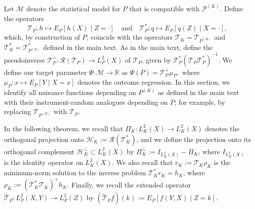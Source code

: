 \documentclass[11pt]{article}
\theoremstyle{plain}
\theoremstyle{definition}
\theoremstyle{remark}
\theoremstyle{definition}
\begin{document}
Let \( \mathcal{M} \) denote the statistical model for \( P \) that is compatible with $\mathcal{P}^{(K)}$. Define the operators
\[
\mathcal{T}_P: h \mapsto E_P[h(X) \mid Z = \cdot] \quad \text{and} \quad \mathcal{T}_P^*: q \mapsto E_P[q(Z) \mid X = \cdot],
\]
which, by construction of \( P \), coincide with the operators \( \mathcal{T}_K = \mathcal{T}_{P^{(K)}} \) and \( \mathcal{T}_K^* = \mathcal{T}_{P^{(K)}}^* \) defined in the main text. As in the main text, define the pseudoinverse \( \mathcal{T}_P^+: \mathcal{R}(\mathcal{T}_P) \to L^2_P(X) \) of \( \mathcal{T}_P \), given by \( \mathcal{T}_P^* (\mathcal{T}_P \mathcal{T}_P^*)^{-1} \). We define our target parameter \( \Psi: \mathcal{M} \rightarrow \mathbb{R} \) as $\Psi(P) = \mathcal{T}_P^+ \mu_P,$
where \( \mu_P: x \mapsto E_P[Y \mid X = x] \) denotes the outcome regression. In this section, we identify all nuisance functions depending on \( P^{(K)} \) as defined in the main text with their instrument-random analogues depending on \( P \); for example, by replacing \( \mathcal{T}_{P^{(K)}} \) with \( \mathcal{T}_P \).


 

In the following theorem, we recall that \( \Pi_K : L_K^2(X) \to L_K^2(X) \) denotes the orthogonal projection onto \( \mathcal{H}_K := \mathcal{R}(\mathcal{T}_K^*) \), and we define the projection onto its orthogonal complement \( \mathcal{H}_K^\perp \subset L_K^2(X) \) by \( \Pi_K^\perp := I_{L_K^2(X)} - \Pi_K \), where \( I_{L_K^2(X)} \) is the identity operator on \( L_K^2(X) \). We also recall that \( r_K := \mathcal{T}_K \rho_K \) is the minimum-norm solution to the inverse problem \( \mathcal{T}_K^* r_K = h_K \), where \( \rho_K := (\mathcal{T}_K^* \mathcal{T}_K)^+ h_K \). Finally, we recall the extended operator $\widetilde{\mathcal{T}}_P: L^2_P(X,Y) \rightarrow L^2_P(Z)$ by $(\widetilde{\mathcal{T}}_Pf)(k) := E_{P}[f(Y, X) \mid Z = k]$. 


 
  
\end{document}
